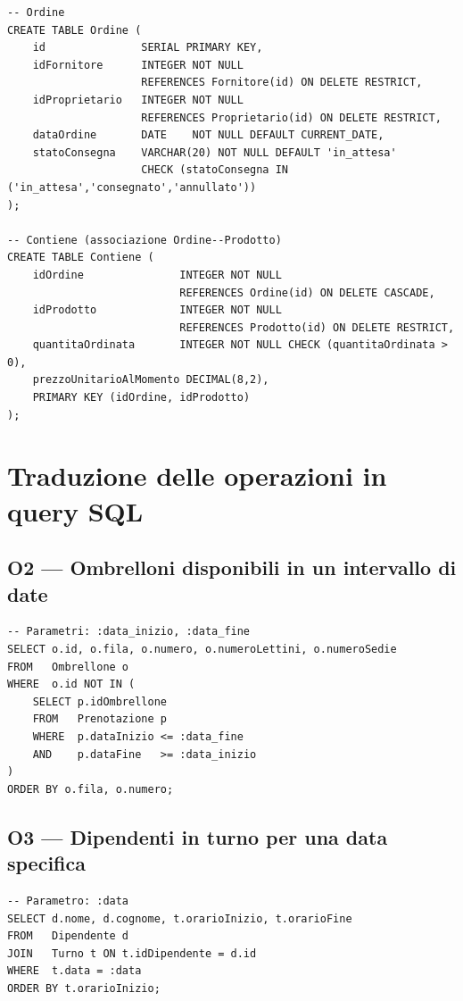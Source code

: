 \begin{lstlisting}[caption={Creazione delle tabelle principali},
                   label={lst:create-tables}]
-- Ordine
CREATE TABLE Ordine (
    id               SERIAL PRIMARY KEY,
    idFornitore      INTEGER NOT NULL
                     REFERENCES Fornitore(id) ON DELETE RESTRICT,
    idProprietario   INTEGER NOT NULL
                     REFERENCES Proprietario(id) ON DELETE RESTRICT,
    dataOrdine       DATE    NOT NULL DEFAULT CURRENT_DATE,
    statoConsegna    VARCHAR(20) NOT NULL DEFAULT 'in_attesa'
                     CHECK (statoConsegna IN ('in_attesa','consegnato','annullato'))
);

-- Contiene (associazione Ordine--Prodotto)
CREATE TABLE Contiene (
    idOrdine               INTEGER NOT NULL
                           REFERENCES Ordine(id) ON DELETE CASCADE,
    idProdotto             INTEGER NOT NULL
                           REFERENCES Prodotto(id) ON DELETE RESTRICT,
    quantitaOrdinata       INTEGER NOT NULL CHECK (quantitaOrdinata > 0),
    prezzoUnitarioAlMomento DECIMAL(8,2),
    PRIMARY KEY (idOrdine, idProdotto)
);
\end{lstlisting}

\section{Traduzione delle operazioni in query SQL}

\subsection{O2 --- Ombrelloni disponibili in un intervallo di date}

\begin{lstlisting}[caption={O2: Ombrelloni disponibili per una data}]
-- Parametri: :data_inizio, :data_fine
SELECT o.id, o.fila, o.numero, o.numeroLettini, o.numeroSedie
FROM   Ombrellone o
WHERE  o.id NOT IN (
    SELECT p.idOmbrellone
    FROM   Prenotazione p
    WHERE  p.dataInizio <= :data_fine
    AND    p.dataFine   >= :data_inizio
)
ORDER BY o.fila, o.numero;
\end{lstlisting}

\subsection{O3 --- Dipendenti in turno per una data specifica}

\begin{lstlisting}[caption={O3: Dipendenti in turno per una data}]
-- Parametro: :data
SELECT d.nome, d.cognome, t.orarioInizio, t.orarioFine
FROM   Dipendente d
JOIN   Turno t ON t.idDipendente = d.id
WHERE  t.data = :data
ORDER BY t.orarioInizio;
\end{lstlisting}

